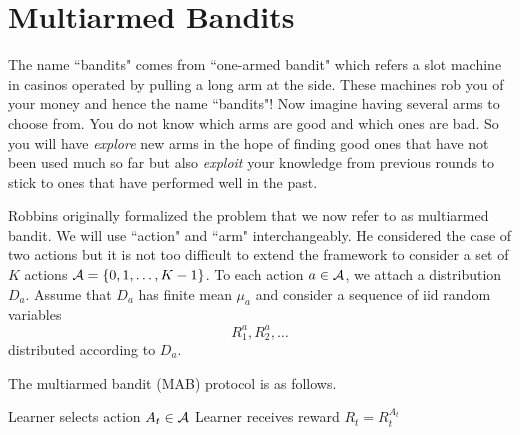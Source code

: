 \documentclass[11pt]{article}
\begin{document}
\section{Multiarmed Bandits}

The name ``bandits" comes from ``one-armed bandit" which refers a slot machine in casinos operated by pulling a long arm at the side. These machines rob you of your money and hence the name ``bandits"!
Now imagine having several arms to choose from. You do not know which arms are good and which ones are bad. So you will have \emph{explore} new arms in the hope of finding good ones that have not been used much
so far but also \emph{exploit} your knowledge from previous rounds to stick to ones that have performed well in the past.

Robbins \cite{robbins1952some} originally formalized the problem that we now refer to as multiarmed bandit. We will use ``action" and ``arm" interchangeably. He considered the case of two actions
but it is not too difficult to extend the framework to consider a set of $K$ actions $\mathcal{A} = \{0,1,\ldots,K-1\}$. To each action $a \in \mathcal{A}$, we attach a distribution $D_a$. Assume that $D_a$ has finite mean $\mu_a$ and
consider a sequence of iid random variables
\[
R^a_1,R^a_2,\ldots
\]
distributed according to $D_a$.

The multiarmed bandit (MAB) protocol is as follows.

\begin{algorithmic}[1]
\STATE Learner selects action $A_t \in \mathcal{A}$
\STATE Learner receives reward $R_t = R^{A_t}_t$
\ENDFOR
\end{algorithmic}


\end{document}
